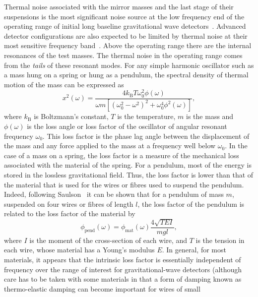 Thermal noise associated with the mirror masses and the last stage of their
suspensions is the most significant noise source at the low frequency end of the
operating range of initial long baseline gravitational wave
detectors~\cite{Saulson2}. Advanced detector configurations are also expected to
be limited by thermal noise at their most sensitive frequency
band~\cite{Levin, Nakagawa:2002, Harry:2002, Crooks:2002}. Above the operating
range there are the internal resonances of the test masses. The thermal noise in
the operating range comes from the \emph{tails} of these resonant modes. For any
simple harmonic oscillator such as a mass hung on a spring or hung as a pendulum,
the spectral density of thermal motion of the mass can be expressed
as~\cite{Saulson2}
\begin{equation}
  x^{2}(\omega) = \frac{4 k_{\mathrm{B}} T \omega_{0}^{2}
  \phi(\omega)}{\omega m [{(\omega_{0}^{2} - \omega^{2})^2 +
  \omega_{0}^{4} \phi^{2}(\omega)}]},
  \label{equation:thnoise}
\end{equation}
where $k_{\mathrm{B}}$ is Boltzmann's constant, $T$ is the temperature, $m$ is the
mass and  $\phi(\omega)$ is the loss angle or loss factor of the
oscillator of angular resonant frequency $\omega_0$. This loss factor is the
phase lag angle between the displacement of the mass and any force applied to
the mass at a frequency well below $\omega_0$. In the case of a mass on a spring,
the loss factor is a measure of the mechanical loss associated with the material
of the spring. For a pendulum, most of the energy is stored in the lossless
gravitational field. Thus, the loss factor is lower than that of the material that
is used for the wires or fibres used to suspend the pendulum. Indeed,
following Saulson~\cite{Saulson2} it can be shown that for a pendulum of mass
$m$, suspended on four wires or fibres of length $l$, the loss factor of the
pendulum is related to the loss factor of the material by
\begin{equation}
  \phi_{\mathrm{pend}}(\omega) = \phi_{\mathrm{mat}}(\omega)\frac{4 \sqrt{TEI}}{mgl},
  \label{equation:pend}
\end{equation}
where $I$ is the moment of the cross-section of  each wire, and $T$ is the
tension in each wire, whose material has a Young's modulus $E$. In general, for
most materials, it appears that the intrinsic loss factor is essentially
independent of frequency over the range of interest for gravitational-wave
detectors (although care has to be taken with some materials in that a form of
damping known as thermo-elastic damping can become important for wires of small
